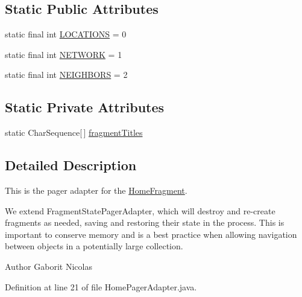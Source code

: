 \subsection*{Static Public Attributes}
\begin{DoxyCompactItemize}
\item 
static final int \hyperlink{classcom_1_1qualoutdoor_1_1recorder_1_1home_1_1HomePagerAdapter_a80a55359533492fff489ccf05f31737e}{L\-O\-C\-A\-T\-I\-O\-N\-S} = 0
\item 
static final int \hyperlink{classcom_1_1qualoutdoor_1_1recorder_1_1home_1_1HomePagerAdapter_a6c9e92c7dbb64889b63eeda0a4f56669}{N\-E\-T\-W\-O\-R\-K} = 1
\item 
static final int \hyperlink{classcom_1_1qualoutdoor_1_1recorder_1_1home_1_1HomePagerAdapter_ab5e43cd4f4e94b05c2d9e948928f78fc}{N\-E\-I\-G\-H\-B\-O\-R\-S} = 2
\end{DoxyCompactItemize}
\subsection*{Static Private Attributes}
\begin{DoxyCompactItemize}
\item 
static Char\-Sequence\mbox{[}$\,$\mbox{]} \hyperlink{classcom_1_1qualoutdoor_1_1recorder_1_1home_1_1HomePagerAdapter_a38a78f8e084ee728e6ea5c0abfa548f0}{fragment\-Titles}
\end{DoxyCompactItemize}


\subsection{Detailed Description}
This is the pager adapter for the \hyperlink{classcom_1_1qualoutdoor_1_1recorder_1_1home_1_1HomeFragment}{Home\-Fragment}.

We extend Fragment\-State\-Pager\-Adapter, which will destroy and re-\/create fragments as needed, saving and restoring their state in the process. This is important to conserve memory and is a best practice when allowing navigation between objects in a potentially large collection.

\begin{DoxyAuthor}{Author}
Gaborit Nicolas 
\end{DoxyAuthor}


Definition at line 21 of file Home\-Pager\-Adapter.\-java.




